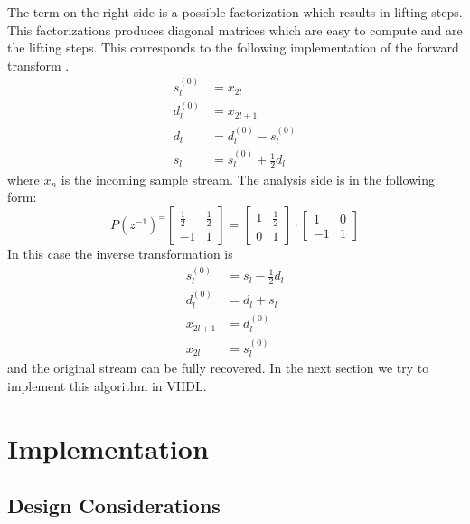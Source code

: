 \begin{refsection}
The term on the right side is a possible factorization which results in lifting steps.
This factorizations produces diagonal matrices which are easy to compute and are the lifting steps.
This corresponds to the following implementation of the forward transform \cite{fpga:Daubechies1998}.
\begin{equation}\label{fpga:equation:haar}
	\begin{aligned}
	s_l^{(0)} &= x_{2l} \\
	d_l^{(0)} &= x_{2l+1} \\ 
	d_l &= d_l^{(0)} - s_l^{(0)} \\
	s_l &= s_l^{(0)} + \frac{1}{2}d_l
	\end{aligned}
\end{equation}
where $x_{n}$ is the incoming sample stream.
The analysis side is in the following form:
\begin{equation*}
P(z^{-1})^ =
\begin{bmatrix}
\frac{1}{2} & \frac{1}{2} \\
-1 & 1
\end{bmatrix}
= 
\begin{bmatrix}
1 & \frac{1}{2} \\
0 & 1
\end{bmatrix}
\cdot
\begin{bmatrix}
1 & 0 \\
-1 & 1
\end{bmatrix}
\end{equation*}
In this case the inverse transformation is 
\begin{equation}\label{fpga:equation:inv_haar}
\begin{aligned}
s_l^{(0)} &= s_l - \frac{1}{2}d_l \\
d_l^{(0)} &= d_l + s_l \\ 
x_{2l+1}& =d_l^{(0)} \\
x_{2l} &= s_l^{(0)}
\end{aligned}
\end{equation}
and the original stream can be fully recovered.
In the next section we try to implement this algorithm in VHDL.

\section{Implementation}

\subsection{Design Considerations}


\end{refsection}
